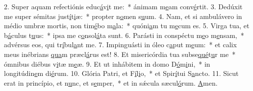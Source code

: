 2. Super aquam refectiónis educ\uline{á}v\uline{i}t me:~* ánimam m\uline{e}am conv\uline{é}rtit.
3. Dedúxit me super sémitas just\uline{í}t\uline{i}æ:~* propter n\uline{o}men s\uline{u}um.
4. Nam, et si ambulávero in médio umbræ mortis, non tim\uline{é}bo m\uline{a}la:~* quóni\uline{a}m tu m\uline{e}cum es.
5. Virga tua, et b\uline{á}culus t\uline{u}us:~* ipsa me c\uline{o}nsol\uline{á}ta sunt.
6. Parásti in conspéctu m\uline{e}o m\uline{e}nsam,~* advérsus eos, qui tr\uline{í}bul\uline{a}nt me.
7. Impinguásti in óleo c\uline{a}put m\uline{e}um:~* et calix meus inébrians \uline{qua}m præcl\uline{á}rus est!
8. Et misericórdia tua subse\uline{qué}t\uline{u}r me~* ómnibus diébus v\uline{i}tæ m\uline{e}æ.
9. Et ut inhábitem in domo D\uline{ó}m\uline{i}ni,~* in longitúdin\uline{e}m di\uline{é}rum.
10. Glória Patri, et F\uline{í}l\uline{i}o,~* et Spir\uline{í}tui S\uline{a}ncto.
11. Sicut erat in princípio, et n\uline{u}nc, et s\uline{e}mper,~* et in sǽcula sæcul\uline{ó}rum. \uline{A}men.
